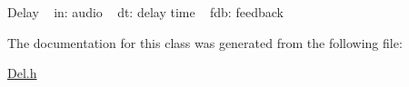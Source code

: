 Delay ~\newline
in\+: audio ~\newline
dt\+: delay time ~\newline
fdb\+: feedback 

The documentation for this class was generated from the following file\+:\begin{DoxyCompactItemize}
\item 
\hyperlink{_del_8h}{Del.\+h}\end{DoxyCompactItemize}
